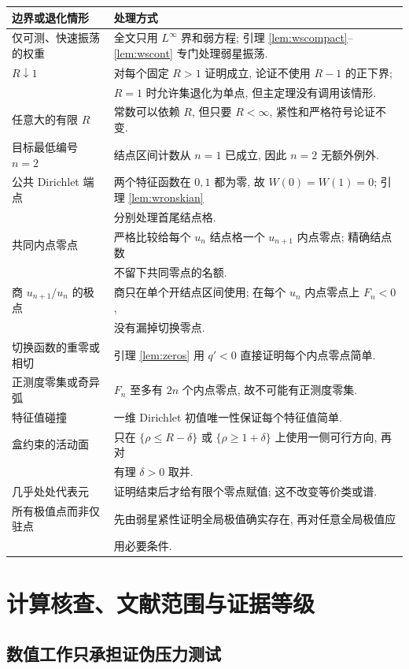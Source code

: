\documentclass[UTF8]{ctexart}
\begin{document}
\begin{center}
\begin{tabular}{ll}
\toprule
边界或退化情形 & 处理方式\\
\midrule
仅可测、快速振荡的权重 &
全文只用 $L^\infty$ 界和弱方程; 引理 \ref{lem:wscompact}--\ref{lem:wscont} 专门处理弱星振荡.\\
$R\downarrow1$ &
对每个固定 $R>1$ 证明成立, 论证不使用 $R-1$ 的正下界;\\
& $R=1$ 时允许集退化为单点, 但主定理没有调用该情形.\\
任意大的有限 $R$ &
常数可以依赖 $R$, 但只要 $R<\infty$, 紧性和严格符号论证不变.\\
目标最低编号 $n=2$ &
结点区间计数从 $n=1$ 已成立, 因此 $n=2$ 无额外例外.\\
公共 Dirichlet 端点 &
两个特征函数在 $0,1$ 都为零, 故 $W(0)=W(1)=0$; 引理 \ref{lem:wronskian}\\
& 分别处理首尾结点格.\\
共同内点零点 &
严格比较给每个 $u_n$ 结点格一个 $u_{n+1}$ 内点零点; 精确结点数\\
& 不留下共同零点的名额.\\
商 $u_{n+1}/u_n$ 的极点 &
商只在单个开结点区间使用; 在每个 $u_n$ 内点零点上 $F_n<0$,\\
& 没有漏掉切换零点.\\
切换函数的重零或相切 &
引理 \ref{lem:zeros} 用 $q'<0$ 直接证明每个内点零点简单.\\
正测度零集或奇异弧 &
$F_n$ 至多有 $2n$ 个内点零点, 故不可能有正测度零集.\\
特征值碰撞 &
一维 Dirichlet 初值唯一性保证每个特征值简单.\\
盒约束的活动面 &
只在 $\{\rho\le R-\delta\}$ 或 $\{\rho\ge1+\delta\}$ 上使用一侧可行方向, 再对\\
& 有理 $\delta>0$ 取并.\\
几乎处处代表元 &
证明结束后才给有限个零点赋值; 这不改变等价类或谱.\\
所有极值点而非仅驻点 &
先由弱星紧性证明全局极值确实存在, 再对任意全局极值应\\
& 用必要条件.\\
\bottomrule
\end{tabular}
\end{center}

\section{计算核查、文献范围与证据等级}
\subsection{数值工作只承担证伪压力测试}
\end{document}
